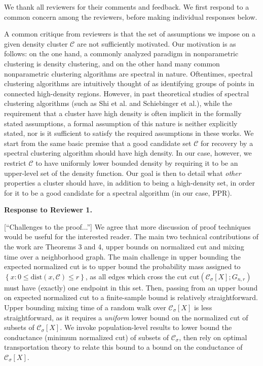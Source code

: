 \documentclass{article}
\newcommand{\set}[1]{\left\{#1\right\}}
\newcommand{\1}{\mathbb{I}}
\theoremstyle{alden}
\theoremstyle{aldenthm}
\theoremstyle{definition}
\theoremstyle{remark}
\begin{document}
	
We thank all reviewers for their comments and feedback. We first respond to a common concern among the reviewers, before making individual responses below.

A common critique from reviewers is that the set of assumptions we impose on a given density cluster $\mathcal{C}$ are not sufficiently motivated. Our motivation is as follows: on the one hand, a commonly analyzed paradigm in nonparametric clustering is density clustering, and on the other hand many common nonparametric clustering algorithms are spectral in nature. Oftentimes, spectral clustering algorithms are intuitively thought of as identifying groups of points in connected high-density regions. However, in past theoretical studies of spectral clustering algorithms (such as Shi et al. and Schiebinger et al.), while the requirement that a cluster have high density is often implicit in the formally stated assumptions, a formal assumption of this nature is neither explicitly stated, nor is it sufficient to satisfy the required assumptions in these works. 
We start from the same basic premise that a good candidate set $\mathcal{C}$ for recovery by a spectral clustering algorithm should have high density. In our case, however, we restrict $\mathcal{C}$ to have uniformly lower bounded density by requiring it to be an upper-level set of the density function. Our goal is then to detail what \textit{other} properties a cluster should have, in addition to being a high-density set, in order for it to be a good candidate for a spectral algorithm (in our case, \textrm{PPR}).

\textbf{Response to Reviewer 1.}

[``Challenges to the proof...''] We agree that more discussion of proof techniques would be useful for the interested reader. The main two technical contributions of the work are Theorems 3 and 4, upper bounds on normalized cut and mixing time over a neighborhood graph. The main challenge in upper bounding the expected normalized cut is to upper bound the probability mass assigned to $\set{x: 0 \leq \mathrm{dist}(x,\mathcal{C}) \leq r}$, as all edges which cross the cut $\mathrm{cut}(\mathcal{C}_{\sigma}[X]; G_{n,r})$ must have (exactly) one endpoint in this set. Then, passing from an upper bound on expected normalized cut to a finite-sample bound is relatively straightforward. Upper bounding mixing time of a random walk over $\mathcal{C}_{\sigma}[X]$ is less straightforward, as it requires a \textit{uniform} lower bound on the normalized cut of subsets of $\mathcal{C}_{\sigma}[X]$. We invoke population-level results to lower bound the conductance (minimum normalized cut) of subsets of $\mathcal{C}_{\sigma}$, then rely on optimal transportation theory to relate this bound to a bound on the conductance of $\mathcal{C}_{\sigma}[X]$.
\end{document}
